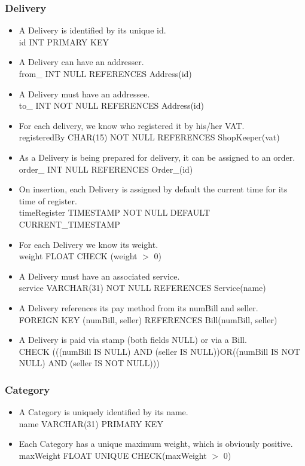 \documentclass{report}[a4paper]
\theoremstyle{remark}
\begin{document}
\subsubsection{Delivery}
\begin{itemize}
    \item A Delivery is identified by its unique id. \\id INT PRIMARY KEY
    \item A Delivery can have an addresser. \\ from\_ INT NULL REFERENCES Address(id)
    \item A Delivery must have an addressee. \\ to\_ INT NOT NULL REFERENCES Address(id)
    \item For each delivery, we know who registered it by his/her VAT. \\ registeredBy CHAR(15) NOT NULL REFERENCES ShopKeeper(vat)
    \item As a Delivery is being prepared for delivery, it can be assigned to an order. \\ order\_ INT NULL REFERENCES Order\_(id)
    \item On insertion, each Delivery is assigned by default the current time for its time of register. \\ timeRegister TIMESTAMP NOT NULL DEFAULT CURRENT\_TIMESTAMP
    \item For each Delivery we know its weight. \\ weight FLOAT CHECK (weight $>$ 0)
    \item A Delivery must have an associated service. \\ service VARCHAR(31) NOT NULL REFERENCES Service(name)
    \item A Delivery references its pay method from its numBill and seller. \\ FOREIGN KEY (numBill, seller) REFERENCES Bill(numBill, seller)
    \item A Delivery is paid via stamp (both fields NULL) or via a Bill. \\ CHECK (((numBill IS NULL) AND (seller IS NULL))OR((numBill IS NOT NULL) AND (seller IS NOT NULL)))
\end{itemize}
\subsubsection{Category}
\begin{itemize}
    \item A Category is uniquely identified by its name. \\ name VARCHAR(31) PRIMARY KEY
    \item Each Category has a unique maximum weight, which is obviously positive. \\ maxWeight FLOAT UNIQUE CHECK(maxWeight $>$ 0)
\end{itemize}
\end{document}
